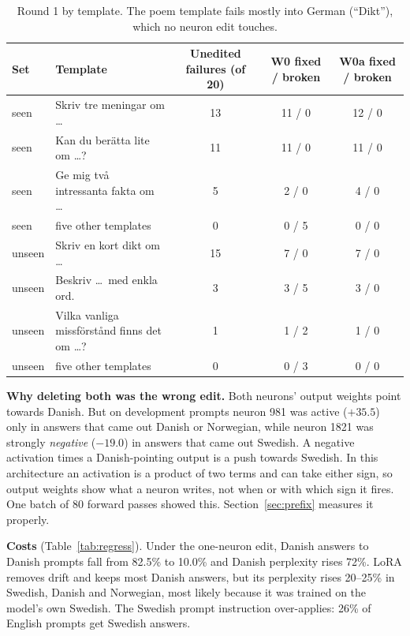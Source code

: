 \documentclass[10pt,a4paper]{article}
\begin{document}
\begin{table}[H]\footnotesize\centering
\begin{tabular}{@{}llccc@{}}
\toprule
Set & Template & Unedited failures (of 20) & W0 fixed / broken & W0a fixed / broken\\
\midrule
seen & Skriv tre meningar om \dots & 13 & 11 / 0 & 12 / 0\\
seen & Kan du berätta lite om \dots? & 11 & 11 / 0 & 11 / 0\\
seen & Ge mig två intressanta fakta om \dots & 5 & 2 / 0 & 4 / 0\\
seen & five other templates & 0 & 0 / 5 & 0 / 0\\
unseen & Skriv en kort dikt om \dots & 15 & 7 / 0 & 7 / 0\\
unseen & Beskriv \dots\ med enkla ord. & 3 & 3 / 5 & 3 / 0\\
unseen & Vilka vanliga missförstånd finns det om \dots? & 1 & 1 / 2 & 1 / 0\\
unseen & five other templates & 0 & 0 / 3 & 0 / 0\\
\bottomrule
\end{tabular}
\caption{Round 1 by template. The poem template fails mostly into German (``Dikt''), which no neuron edit touches.}\label{tab:tmpl}
\end{table}

\textbf{Why deleting both was the wrong edit.} Both neurons' output weights point towards Danish. But on development prompts neuron 981 was active ($+35.5$) only in answers that came out Danish or Norwegian, while neuron 1821 was strongly \emph{negative} ($-19.0$) in answers that came out Swedish.
A negative activation times a Danish-pointing output is a push towards Swedish. In this architecture an activation is a product of two terms and can take either sign, so output weights show what a neuron writes, not when or with which sign it fires.
One batch of 80 forward passes showed this. Section~\ref{sec:prefix} measures it properly.

\textbf{Costs} (Table~\ref{tab:regress}). Under the one-neuron edit, Danish answers to Danish prompts fall from 82.5\% to 10.0\% and Danish perplexity rises 72\%. LoRA removes drift and keeps most Danish answers, but its perplexity rises 20--25\% in Swedish, Danish and Norwegian,
most likely because it was trained on the model's own Swedish. The Swedish prompt instruction over-applies: 26\% of English prompts get Swedish answers.
\end{document}

